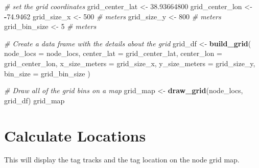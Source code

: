 \documentclass[
]{book}
\newenvironment{Shaded}{\begin{snugshade}}{\end{snugshade}}
\newcommand{\AttributeTok}[1]{\textcolor[rgb]{0.13,0.29,0.53}{#1}}
\newcommand{\CommentTok}[1]{\textcolor[rgb]{0.56,0.35,0.01}{\textit{#1}}}
\newcommand{\DecValTok}[1]{\textcolor[rgb]{0.00,0.00,0.81}{#1}}
\newcommand{\FloatTok}[1]{\textcolor[rgb]{0.00,0.00,0.81}{#1}}
\newcommand{\FunctionTok}[1]{\textcolor[rgb]{0.13,0.29,0.53}{\textbf{#1}}}
\newcommand{\NormalTok}[1]{#1}
\newcommand{\OtherTok}[1]{\textcolor[rgb]{0.56,0.35,0.01}{#1}}
\newcommand{\SpecialCharTok}[1]{\textcolor[rgb]{0.81,0.36,0.00}{\textbf{#1}}}
\begin{document}
\begin{Shaded}
\begin{Highlighting}[]
\CommentTok{\# set the grid coordinates}
\NormalTok{grid\_center\_lat }\OtherTok{\textless{}{-}} \FloatTok{38.93664800}
\NormalTok{grid\_center\_lon }\OtherTok{\textless{}{-}} \SpecialCharTok{{-}}\FloatTok{74.9462}
\NormalTok{grid\_size\_x }\OtherTok{\textless{}{-}} \DecValTok{500} \CommentTok{\# meters}
\NormalTok{grid\_size\_y }\OtherTok{\textless{}{-}} \DecValTok{800} \CommentTok{\# meters}
\NormalTok{grid\_bin\_size }\OtherTok{\textless{}{-}} \DecValTok{5} \CommentTok{\# meters}

\CommentTok{\# Create a data frame with the details about the grid}
\NormalTok{grid\_df }\OtherTok{\textless{}{-}} \FunctionTok{build\_grid}\NormalTok{(}
  \AttributeTok{node\_locs =}\NormalTok{ node\_locs,}
  \AttributeTok{center\_lat =}\NormalTok{ grid\_center\_lat,}
  \AttributeTok{center\_lon =}\NormalTok{ grid\_center\_lon,}
  \AttributeTok{x\_size\_meters =}\NormalTok{ grid\_size\_x,}
  \AttributeTok{y\_size\_meters =}\NormalTok{ grid\_size\_y,}
  \AttributeTok{bin\_size =}\NormalTok{ grid\_bin\_size}
\NormalTok{)}

\CommentTok{\# Draw all of the grid bins on a map}
\NormalTok{grid\_map }\OtherTok{\textless{}{-}} \FunctionTok{draw\_grid}\NormalTok{(node\_locs, grid\_df)}
\NormalTok{grid\_map}
\end{Highlighting}
\end{Shaded}

\section{Calculate Locations}\label{calculate-locations}

This will display the tag tracks and the tag location on the node grid map.
\end{document}
